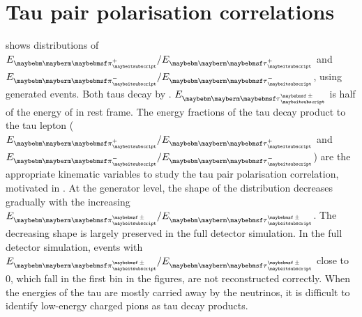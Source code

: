 \section{Tau pair polarisation correlations}
\label{sec:TauMiniCorr}

 shows distributions of $E_{\Ppiplus} / E_{\APtauon}$ and $E_{\Ppiminus} / E_{\Ptauon}$, using generated \eeZZQQ events. Both taus decay by \tauToPionBoth. $E_{\Ptaupm}$ is half of the energy of \ZForTauTau in \ZForTauTau rest frame. The energy fractions of the tau decay product to the tau lepton ($E_{\Ppiplus} / E_{\APtauon}$ and $E_{\Ppiminus} / E_{\Ptauon}$) are the appropriate kinematic variables to study the tau pair polarisation correlation, motivated in . At the generator level, the shape of the distribution decreases gradually with the increasing $E_{\Ppipm}/E_{\Ptaupm}$. The decreasing shape is largely preserved in the full detector simulation. In the full detector simulation, events with  $E_{\Ppipm}/E_{\Ptaupm}$ close to 0, which fall in the first bin in the figures, are not reconstructed correctly. When the energies of the tau are mostly carried away by the neutrinos, it is difficult to identify low-energy charged pions as tau decay products.


